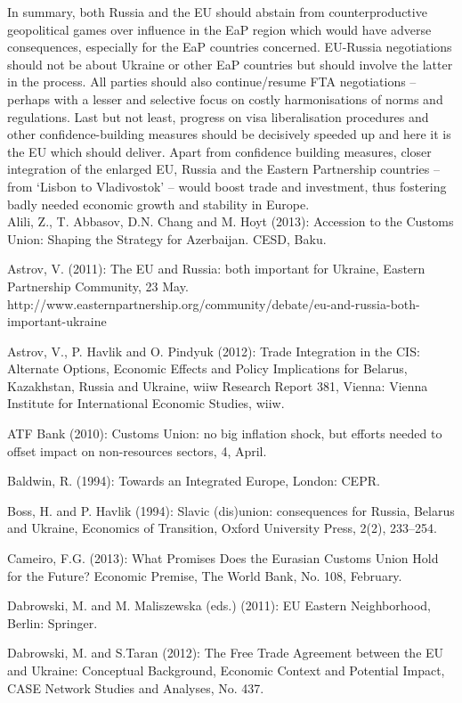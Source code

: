 In summary, both Russia and the EU should abstain from counterproductive geopolitical games over influence in the EaP region which would have adverse consequences, especially for the EaP countries concerned. EU-Russia negotiations should not be about Ukraine or other EaP countries but should involve the latter in the process. All parties should also continue/resume FTA negotiations -- perhaps with a lesser and selective focus on costly harmonisations of norms and regulations. Last but not least, progress on visa liberalisation procedures and other confidence-building measures should be decisively speeded up and here it is the EU which should deliver. Apart from confidence building measures, closer integration of the enlarged EU, Russia and the Eastern Partnership countries -- from `Lisbon to Vladivostok' -- would boost trade and investment, thus fostering badly needed economic growth and stability in Europe.\\

Alili, Z., T. Abbasov, D.N. Chang and M. Hoyt (2013): Accession to the Customs Union: Shaping the Strategy for Azerbaijan. CESD, Baku.

Astrov, V. (2011): The EU and Russia: both important for Ukraine, Eastern Partnership Community, 23 May. http://www.easternpartnership.org/community/debate/eu-and-russia-both-important-ukraine

Astrov, V., P. Havlik and O. Pindyuk (2012): Trade Integration in the CIS: Alternate Options, Economic Effects and Policy Implications for Belarus, Kazakhstan, Russia and Ukraine, wiiw Research Report 381, Vienna: Vienna Institute for International Economic Studies, wiiw.

ATF Bank (2010): Customs Union: no big inflation shock, but efforts needed to offset impact on non-resources sectors, 4, April.

Baldwin, R. (1994): Towards an Integrated Europe, London: CEPR.

Boss, H. and P. Havlik (1994): Slavic (dis)union: consequences for Russia, Belarus and Ukraine, Economics of Transition, Oxford University Press, 2(2), 233--254.

Cameiro, F.G. (2013): What Promises Does the Eurasian Customs Union Hold for the Future? Economic Premise, The World Bank, No. 108, February.

Dabrowski, M. and M. Maliszewska (eds.) (2011): EU Eastern Neighborhood, Berlin: Springer.

Dabrowski, M. and S.Taran (2012): The Free Trade Agreement between the EU and Ukraine: Conceptual Background, Economic Context and Potential Impact, CASE Network Studies and Analyses, No. 437. 


